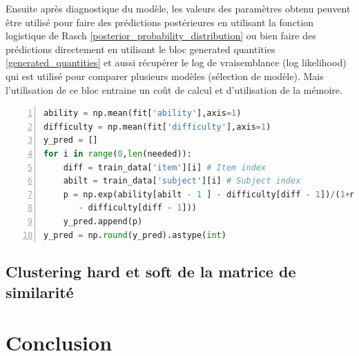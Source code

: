 Ensuite après diagnostique du modèle, les valeurs des paramètres obtenu peuvent être utilisé pour faire des prédictions postérieures en utilisant la fonction logistique de Rasch \ref{posterior_probability_distribution} ou bien faire des prédictions directement en utilisant le bloc generated quantities \ref{generated_quantities} et aussi récupérer le log de vraisemblance (log likelihood) qui est utilisé pour comparer plusieurs modèles (sélection de modèle). Mais l’utilisation de ce bloc entraine un coût de calcul et d'utilisation de la mémoire.

\begin{lstlisting}[language=Python,label={answersusinghint},stringstyle=\color{deepgreen},basicstyle=\scriptsize, frame=l,framesep=4.5mm,framexleftmargin=2.5mm,tabsize=2,numbers=left,fillcolor=\color{blueforest!70},rulecolor=\color{blueforest},numberstyle=\normalfont\tiny\color{white}]
ability = np.mean(fit['ability'],axis=1)
difficulty = np.mean(fit['difficulty'],axis=1)
y_pred = []
for i in range(0,len(needed)):
	diff = train_data['item'][i] # Item index
	abilt = train_data['subject'][i] # Subject index
	p = np.exp(ability[abilt - 1 ] - difficulty[diff - 1])/(1+np.exp(ability[abilt - 1] 
	   - difficulty[diff - 1]))
	y_pred.append(p)
y_pred = np.round(y_pred).astype(int)
\end{lstlisting}

\subsection{Clustering hard et soft de la matrice de similarité}

\section{Conclusion}

